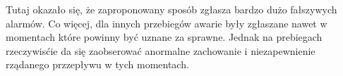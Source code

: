 \documentclass[a4paper,12pt]{article}
\begin{document}
Tutaj okazało się, że zaproponowany sposób zgłasza bardzo dużo fałszywych alarmów. Co więcej, dla innych przebiegów awarie były zgłaszane nawet w momentach które powinny być uznane za sprawne. Jednak na prebiegach rzeczywisćie da się zaobserować anormalne zachowanie i niezapewnienie rządanego przzepływu w tych momentach. 













\end{document}
